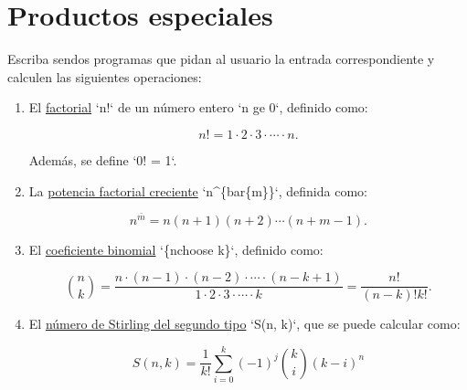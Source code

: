 \section{Productos especiales}

Escriba sendos programas que pidan al usuario la entrada correspondiente
y calculen las siguientes operaciones:

\begin{enumerate}
\item
  El \href{http://mathworld.wolfram.com/Factorial.html}{factorial} `n!`
  de un número entero `n ge 0`, definido como:

  \[n! = 1\cdot 2\cdot 3\cdot \cdots \cdot n.\]

  Además, se define `0! = 1`.
\item
  La \href{http://mathworld.wolfram.com/RisingFactorial.html}{potencia
  factorial creciente} `n\^{}\{bar\{m\}\}`, definida como:

  \[n^{\bar m} = n (n + 1) (n + 2) \cdots (n + m - 1).\]
\item
  El
  \href{http://mathworld.wolfram.com/BinomialCoefficient.html}{coeficiente
  binomial} `\{nchoose k\}`, definido como:

  \[{n\choose k} =
  \frac{n\cdot (n-1)\cdot (n-2)\cdot \cdots \cdot (n-k+1)}
  {1\cdot 2\cdot 3\cdot \cdots \cdot k} =
  \frac{n!}{(n - k)! k!}.\]
\item
  El
  \href{http://mathworld.wolfram.com/StirlingNumberoftheSecondKind.html}{número
  de Stirling del segundo tipo} `S(n, k)`, que se puede calcular como:

  \[S(n, k) = \frac{1}{k!}
  \sum_{i=0}^{k} (-1)^j {k\choose i} (k - i)^n\]
\end{enumerate}

